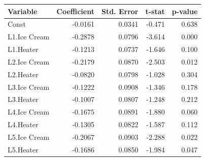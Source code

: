 \documentclass[10pt,a4paper]{article}
\begin{document}
	\begin{center}
	\begin{tabular}{lrrrr}
	\toprule
	Variable & Coefficient & Std. Error & t-stat & p-value \\
	\midrule
	Const & -0.0161 & 0.0341 & -0.471 & 0.638 \\
	L1.Ice Cream & -0.2878 & 0.0796 & -3.614 & 0.000 \\
	L1.Heater & -0.1213 & 0.0737 & -1.646 & 0.100 \\
	L2.Ice Cream & -0.2179 & 0.0870 & -2.503 & 0.012 \\
	L2.Heater & -0.0820 & 0.0798 & -1.028 & 0.304 \\
	L3.Ice Cream & -0.1222 & 0.0908 & -1.346 & 0.178 \\
	L3.Heater & -0.1007 & 0.0807 & -1.248 & 0.212 \\
	L4.Ice Cream & -0.1675 & 0.0891 & -1.880 & 0.060 \\
	L4.Heater & -0.1305 & 0.0822 & -1.587 & 0.112 \\
	L5.Ice Cream & -0.2067 & 0.0903 & -2.288 & 0.022 \\
	L5.Heater & -0.1686 & 0.0850 & -1.984 & 0.047 \\
	\bottomrule
	\end{tabular}
	\end{center}
	
\end{document}
